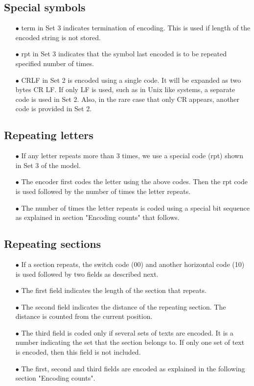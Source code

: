 \documentclass[]{article}
\begin{document}
\subsection{Special symbols}
\begin{itemize}
	\item[$\bullet$] term in Set 3 indicates termination of encoding.  This is used if length of the encoded string is not stored.
	\item[$\bullet$] rpt in Set 3 indicates that the symbol last encoded is to be repeated specified number of times.
	\item[$\bullet$] CRLF in Set 2 is encoded using a single code. It will be expanded as two bytes CR LF.  If only LF is used, such as in Unix like systems, a separate code is used in Set 2.  Also, in the rare case that only CR appears, another code is provided in Set 2.
\end{itemize}

\subsection{Repeating letters}
\begin{itemize}
	\item[$\bullet$] If any letter repeats more than 3 times, we use a special code (rpt) shown in Set 3 of the model.
	\item[$\bullet$] The encoder first codes the letter using the above codes.  Then the rpt code is used followed by the number of times the letter repeats.
	\item[$\bullet$] The number of times the letter repeats is coded using a special bit sequence as explained in section "Encoding counts" that follows.
\end{itemize}

\subsection{Repeating sections}
\begin{itemize}
	\item[$\bullet$] If a section repeats, the switch code (00) and another horizontal code (10) is used followed by two fields as described next.
  	\item[$\bullet$] The first field indicates the length of the section that repeats.
	\item[$\bullet$] The second field indicates the distance of the repeating section.  The distance is counted from the current position.
	\item[$\bullet$] The third field is coded only if several sets of texts are encoded.  It is a number indicating the set that the section belongs to.  If only one set of text is encoded, then this field is not included. 
	\item[$\bullet$] The first, second and third fields are encoded as explained in the following section "Encoding counts".
\end{itemize}
\end{document}
